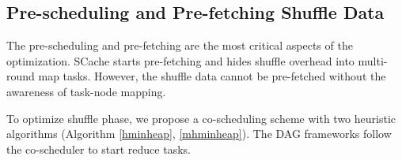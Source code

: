 {\color{black}
\subsection{Pre-scheduling and Pre-fetching Shuffle Data}
The pre-scheduling and pre-fetching are the most critical aspects of the optimization.
SCache starts pre-fetching and hides shuffle overhead into multi-round map tasks.
However, the shuffle data cannot be pre-fetched without the awareness of task-node mapping.

To optimize shuffle phase, we propose a co-scheduling scheme with two heuristic algorithms (Algorithm \ref{hminheap}, \ref{mhminheap}). 
The DAG frameworks follow the co-scheduler to start reduce tasks.
}

